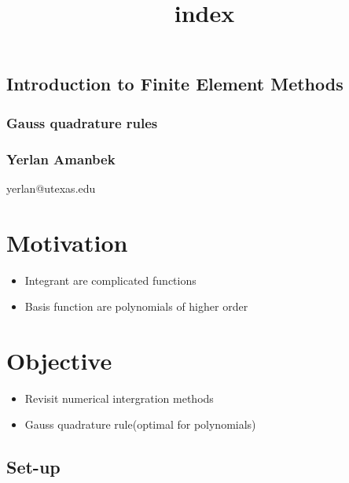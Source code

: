 \documentclass[11pt]{article}
\title{index}
\providecommand{\tightlist}{%
      \setlength{\itemsep}{0pt}\setlength{\parskip}{0pt}}
\begin{document}
    
    
    \maketitle
    
    

    
    \subsection{Introduction to Finite Element
Methods}\label{introduction-to-finite-element-methods}

\subsubsection{Gauss quadrature rules}\label{gauss-quadrature-rules}

\subsubsection{Yerlan Amanbek}\label{yerlan-amanbek}

 yerlan@utexas.edu 

    \section{Motivation}\label{motivation}

\begin{itemize}
\tightlist
\item
  Integrant are complicated functions
\item
  Basis function are polynomials of higher order
\end{itemize}

\section{Objective}\label{objective}

\begin{itemize}
\tightlist
\item
  Revisit numerical intergration methods
\item
  Gauss quadrature rule(optimal for polynomials)
\end{itemize}

\subsection{Set-up}\label{set-up}
\end{document}

